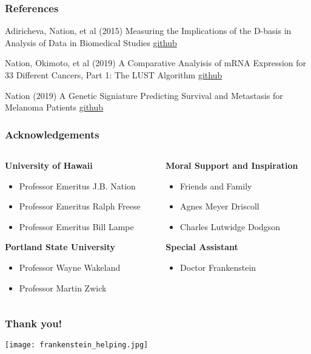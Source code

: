 \documentclass[
	11pt, %
]{beamer}
\begin{document}
\begin{frame} \frametitle{References}
	
	\begin{thebibliography}{99}
		\footnotesize
		
			Adiricheva, Nation, et al (2015)
			\newblock Measuring the Implications of the D-basis in Analysis of Data in Biomedical Studies
			\newblock \href{https://github.com/tristanh314/lust-cancer-2019/blob/master/papers/Dbasinapp.pdf}{github}
			
			Nation, Okimoto, et al (2019)
			\newblock A Comparative Analyisis of mRNA Expression for 33 Different Cancers, Part 1: The LUST Algorithm
			\newblock \href{https://github.com/tristanh314/lust-cancer-2019/blob/master/papers/lust_2019_part_1.pdf}{github}
        
			Nation (2019)
			\newblock A Genetic Signiature Predicting Survival and Metastasis for Melanoma Patients
			\newblock \href{https://github.com/tristanh314/lust-cancer-2019/blob/master/papers/melanoma_signature_2.pdf}{github}
    
        \end{thebibliography}

\end{frame}

\begin{frame}
	\frametitle{Acknowledgements}
	
	\begin{columns}[t] 
		\begin{column}{0.45\textwidth}
			\textbf{University of Hawaii}
			\begin{itemize}
				\item Professor Emeritus J.B. Nation
				\item Professor Emeritus Ralph Freese
				\item Professor Emeritus Bill Lampe
			\end{itemize}
			\textbf{Portland State University}
			\begin{itemize}
				\item Professor Wayne Wakeland
				\item Professor Martin Zwick
			\end{itemize}
		\end{column}		
		\begin{column}{0.45\textwidth}
			\textbf{Moral Support and Inspiration}
			\begin{itemize}
				\item Friends and Family
				\item Agnes Meyer Driscoll
                \item Charles Lutwidge Dodgson
			\end{itemize}
            \textbf{Special Assistant}
            \begin{itemize}
                \item Doctor Frankenstein
            \end{itemize}
		\end{column}
	\end{columns}
\end{frame}

\begin{frame}
    \frametitle{Thank you!}

    \begin{center}
        \texttt{[image: frankenstein\_helping.jpg]}
    \end{center}
\end{frame}
\end{document}
